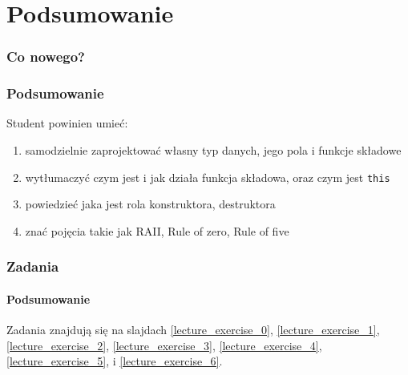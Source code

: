 \documentclass[aspectratio=169,10pt]{beamer}
\begin{document}
\section{Podsumowanie}

\begin{frame}
    \frametitle{Co nowego?}
    \frametitle{Podsumowanie}

    Student powinien umieć:

    \begin{enumerate}
        \item samodzielnie zaprojektować własny typ danych, jego pola i funkcje
            składowe
        \item wytłumaczyć czym jest i jak działa funkcja składowa, oraz czym
            jest {\tt this}
        \item powiedzieć jaka jest rola konstruktora, destruktora
        \item znać pojęcia takie jak RAII, Rule of zero, Rule of five
    \end{enumerate}
\end{frame}

\begin{frame}
    \frametitle{Zadania}
    \framesubtitle{Podsumowanie}

    Zadania znajdują się na slajdach
    \ref{lecture_exercise_0},
    \ref{lecture_exercise_1},
    \ref{lecture_exercise_2},
    \ref{lecture_exercise_3},
    \ref{lecture_exercise_4},
    \ref{lecture_exercise_5}, i
    \ref{lecture_exercise_6}.
\end{frame}
\end{document}
